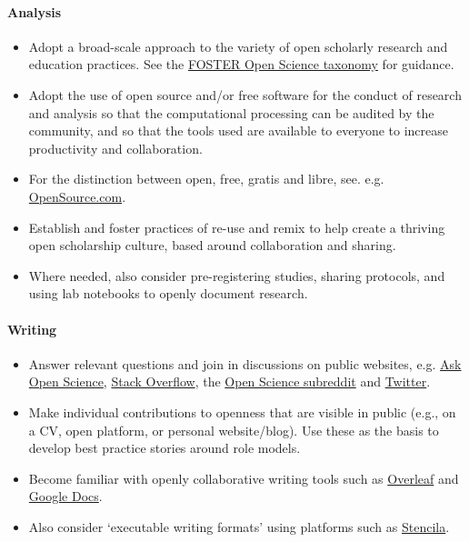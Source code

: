\paragraph{Analysis}\label{analysis}

\begin{itemize}
\item
  Adopt a broad-scale approach to the variety of open scholarly research
  and education practices. See the
  \href{https://www.fosteropenscience.eu/resources}{FOSTER Open Science
  taxonomy} for guidance.
\item
  Adopt the use of open source and/or free software for the conduct of
  research and analysis so that the computational processing can be
  audited by the community, and so that the tools used are available to
  everyone to increase productivity and collaboration.
\item
  For the distinction between open, free, gratis and libre, see. e.g.
  \href{https://opensource.com/article/17/11/open-source-or-free-software}{OpenSource.com}.
\item
  Establish and foster practices of re-use and remix to help create a
  thriving open scholarship culture, based around collaboration and
  sharing.
\item
  Where needed, also consider pre-registering studies, sharing
  protocols, and using lab notebooks to openly document research.
\end{itemize}

\paragraph{Writing}\label{writing}

\begin{itemize}
\item
  Answer relevant questions and join in discussions on public websites,
  e.g. \href{https://ask-open-science.org/}{Ask Open Science},
  \href{https://stackoverflow.com/}{Stack Overflow}, the
  \href{https://www.reddit.com/r/Open_Science/}{Open Science subreddit}
  and \href{https://twitter.com}{Twitter}.
\item
  Make individual contributions to openness that are visible in public
  (e.g., on a CV, open platform, or personal website/blog). Use these as
  the basis to develop best practice stories around role models.
\item
  Become familiar with openly collaborative writing tools such as
  \href{https://www.overleaf.com/}{Overleaf} and
  \href{https://docs.google.com/document/u/0/}{Google Docs}.
\item
  Also consider `executable writing formats' using platforms such as
  \href{https://stenci.la/}{Stencila}.
\end{itemize}

